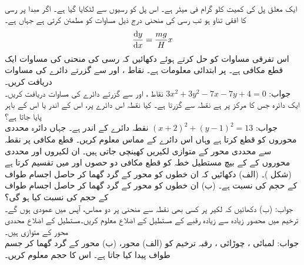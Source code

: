 \\
ایک معلق پل کی کمیت  کلو گرام فی میٹر ہے۔ اس پل کو رسیوں سے لٹکایا گیا ہے۔ اگر مبدا پر رسی کا افقی تناو  ہو تب رسی کی منحنی درج ذیل مساوات کو مطمئن کرتی ہے جہاں  ہے۔
\begin{align*}
\frac{\dif y}{\dif x}=\frac{mg}{H}x
\end{align*}
اس تفرقی مساوات کو حل کرتے ہوئے دکھائیں کہ رسی کی منحنی کی مساوات ایک قطع مکافی ہے۔  پر  ابتدائی معلومات ہے۔
نقاط ،  اور  سے گزرتے دائرے کی مساوات دریافت کریں۔\\
جواب:\quad
$3x^2+3y^2-7x-7y+4=0$
نقاط ،  اور  سے گزرتے دائرے کی مساوات دریافت کریں۔
ایک دائرہ جس کا مرکز  پر ہے نقطہ  سے گزرتا ہے۔  کیا نقطہ  اس دائرے پر، اس کے اندر یا اس کے باہر پایا جاتا ہے؟\\
جواب:\quad
$(x+2)^2+(y-1)^2=13$\quad
نقطہ دائرے کے اندر ہے۔ 
جہاں دائرہ  محددی محوروں کو قطع کرتا ہے وہاں اس دائرے کے مماس معلوم کریں۔ 
قطع مکافی  پر نقطہ  سے محددی محور کے متوازی لکیریں کھینچی جاتی ہیں۔ ان لکیروں اور محددی محوروں کے کے بیچ مستطیل خطہ کو قطع مکافی دو حصوں  اور  میں تقسیم کرتا ہے (شکل )۔ (الف) دکھائیں کہ ان خطوں کو  محور کے گرد گھما کر حاصل اجسام طواف کے حجم کی نسبت  ہے۔ (ب) ان خطوں کو  محور کے گرد گھما کر حاصل اجسام طواف کے حجم کی نسبت کیا ہو گی؟\\
جواب:\quad
(ب)
دکھائیں کہ لکیر  پر  کسی بھی نقطہ سے منحنی  پر دو مماس، آپس میں عمودی ہوں گے۔  
ترخیم  میں محصور زیادہ سے زیادہ رقبے کے مستطیل کے اضلاع معلوم کریں۔مستطیل کے اضلاع محددی محور کے متوازی ہیں۔ \\
جواب:\quad
لمبائی ، چوڑائی ، رقبہ 
ترخیم  کو (الف)  محور، (ب)  محور کے گرد گھما کر جسم طواف پیدا کیا جاتا ہے۔ اس کا حجم معلوم کریں۔
